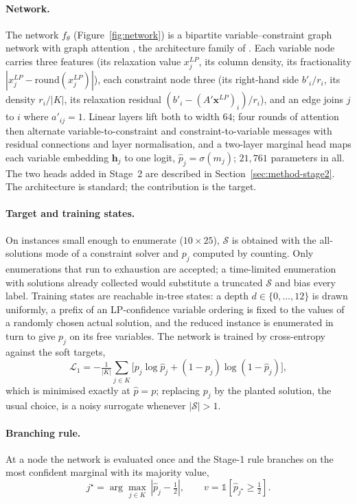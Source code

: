 \documentclass[final,5p,times,twocolumn,authoryear]{elsarticle}
\newcommand{\SOL}{\mathcal{S}}
\begin{document}
\paragraph{Network.} The network $f_\theta$ (Figure~\ref{fig:network}) is a bipartite variable--constraint graph network with graph attention \citep{velickovic2018graph}, the architecture family of \citet{gasse2019exact}. Each variable node carries three features (its relaxation value $x^{LP}_j$, its column density, its fractionality $|x^{LP}_j-\mathrm{round}(x^{LP}_j)|$), each constraint node three (its right-hand side $b'_i/r_i$, its density $r_i/|K|$, its relaxation residual $(b'_i-(A'\mathbf{x}^{LP})_i)/r_i$), and an edge joins $j$ to $i$ where $a'_{ij}=1$. Linear layers lift both to width $64$; four rounds of attention then alternate variable-to-constraint and constraint-to-variable messages with residual connections and layer normalisation, and a two-layer marginal head maps each variable embedding $\mathbf{h}_j$ to one logit, $\hat p_j=\sigma(m_j)$; $21{,}761$ parameters in all. The two heads added in Stage~2 are described in Section~\ref{sec:method-stage2}. The architecture is standard; the contribution is the target.

\paragraph{Target and training states.} On instances small enough to enumerate ($10\times25$), $\SOL$ is obtained with the all-solutions mode of a constraint solver and $p_j$ computed by counting. Only enumerations that run to exhaustion are accepted; a time-limited enumeration with solutions already collected would substitute a truncated $\SOL$ and bias every label. Training states are reachable in-tree states: a depth $d\in\{0,\dots,12\}$ is drawn uniformly, a prefix of an LP-confidence variable ordering is fixed to the values of a randomly chosen actual solution, and the reduced instance is enumerated in turn to give $p_j$ on its free variables. The network is trained by cross-entropy against the soft targets,
\begin{equation}
\mathcal{L}_1=-\tfrac{1}{|K|}\sum_{j\in K}\bigl[p_j\log\hat p_j+(1-p_j)\log(1-\hat p_j)\bigr],
\label{eq:loss1}
\end{equation}
which is minimised exactly at $\hat p=p$; replacing $p_j$ by the planted solution, the usual choice, is a noisy surrogate whenever $|\SOL|>1$.

\paragraph{Branching rule.} At a node the network is evaluated once and the Stage-1 rule branches on the most confident marginal with its majority value,
\begin{equation}
j^\star=\arg\max_{j\in K}\,|\hat p_j-\tfrac12|,\qquad v=\mathbb{1}[\hat p_{j^\star}\ge\tfrac12].
\label{eq:rule1}
\end{equation}
\end{document}
